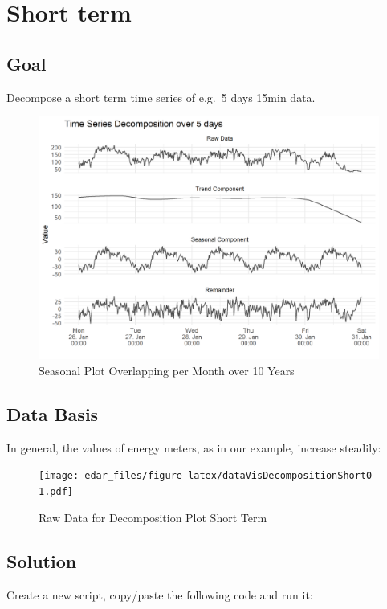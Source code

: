 \documentclass[
]{book}
\begin{document}
\hypertarget{short-term}{%
\section{Short term}\label{short-term}}

\hypertarget{goal-5}{%
\subsection{Goal}\label{goal-5}}

Decompose a short term time series of e.g.~5 days 15min data.

\begin{figure}
\includegraphics[width=0.7\linewidth]{images/plotDecompositionShort} \caption{Seasonal Plot Overlapping per Month over 10 Years}\label{fig:unnamed-chunk-14}
\end{figure}

\hypertarget{data-basis-5}{%
\subsection{Data Basis}\label{data-basis-5}}

In general, the values of energy meters, as in our example, increase steadily:

\begin{figure}
\centering
\texttt{[image: edar\_files/figure-latex/dataVisDecompositionShort0-1.pdf]}
\caption{\label{fig:dataVisDecompositionShort0}Raw Data for Decomposition Plot Short Term}
\end{figure}

\hypertarget{solution-5}{%
\subsection{Solution}\label{solution-5}}

Create a new script, copy/paste the following code and run it:
\end{document}
